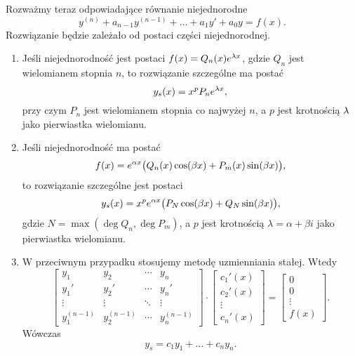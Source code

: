 Rozważmy teraz odpowiadające równanie niejednorodne
%
\begin{equation*}
  y^{(n)} + a_{n-1} y^{(n-1)} + \ldots + a_1 y' + a_0 y = f(x).
\end{equation*}
%
Rozwiązanie będzie zależało od postaci części niejednorodnej.
%
\begin{enumerate}
  \item Jeśli niejednorodność jest postaci $f(x) = Q_n(x) e^{\l x}$, gdzie $Q_n$ jest wielomianem stopnia $n$, to 
  rozwiązanie szczególne ma postać
  \begin{equation*}
    y_s(x) = x^p P_n e^{\l x},
  \end{equation*}
  przy czym $P_n$ jest wielomianem stopnia co najwyżej $n$, a $p$ jest krotnością $\l$ jako pierwiastka wielomianu.
  \item Jeśli niejednorodność ma postać
  \begin{equation*}
    f(x) = e^{\alpha x} \p[\big]{Q_n(x) \cos(\beta x) + P_m(x) \sin (\beta x)},
  \end{equation*}
  to rozwiązanie szczególne jest postaci
  \begin{equation*}
    y_s(x) = x^p e^{\alpha x} \p[\big]{P_N \cos(\beta x) + Q_N \sin(\beta x)},
  \end{equation*}
  gdzie $N = \max(\deg Q_n, \deg P_m)$, a $p$ jest krotnością $\lambda = \alpha + \beta i$ jako pierwiastka wielomianu.
  \item W przeciwnym przypadku stosujemy metodę uzmienniania stałej. Wtedy
  \begin{equation*}
    \begin{bmatrix}
      y_1         & y_2         & \cdots & y_n         \\
      y_1'        & y_2'        & \cdots & y_n'        \\
      \vdots      & \vdots      & \ddots & \vdots      \\
      y_1^{(n-1)} & y_2^{(n-1)} & \cdots & y_n^{(n-1)}
    \end{bmatrix}
    \cdot
    \begin{bmatrix}
      c_1'(x) \\
      c_2'(x) \\
      \vdots  \\
      c_n'(x)
    \end{bmatrix}
    =
    \begin{bmatrix}
    0 \\
    0 \\
    \vdots \\
    f(x)
    \end{bmatrix}.
  \end{equation*}
  Wówczas
  \begin{equation*}
    y_s = c_1 y_1 + \ldots + c_n y_n.
  \end{equation*}
\end{enumerate}
